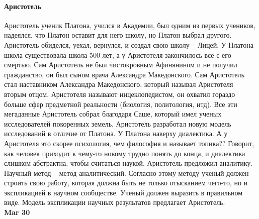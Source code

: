 \documentclass[a4paper, 12pt]{article}
\begin{document}
\paragraph{Аристотель} Аристотель ученик Платона, учился в Академии, был одним из первых учеников, надеялся, что Платон оставит для него школу, но Платон выбрал другого. Аристотель обиделся, уехал, вернулся, и создал свою школу -- Лицей. У Платона школа существовала школа 500 лет, а у Аристотеля закончилось все с его смертью. Сам Аристотель не был чистокровным Афинянином и не получил гражданство, он был сыном врача Александра Македонского. Сам Аристотель стал наставником Александра Македонского, который называл Аристотеля вторым отцом. Аристотеля называют инцеклопедистом, он охватил гораздо больше сфер предметной реальности (биология, политология, итд). Все эти мегаданные Аристотель собрал благодаря Саше, который имел ученых исследователей покоренных земель. Аристотель разработал новую модель исследований в отличие от Платона. У Платона наверху диалектика. А у Аристотеля это скорее психология, чем философия и называет топика?? Говорит, как человек приходит к чему-то новому трудно понять до конца, и диалектика слишком абстрактна, чтобы считаться наукой. Аристотель предложил аналитику. Научный метод -- метод аналитический. Согласно этому методу ученый должен строить свою работу, которая должна быть не только отысканием чего-то, но и экспликацией в научном сообществе. Ученый должен выразить в правильном виде. Модель экспликации научных результатов предлагает Аристотель. \\

\hfill \textbf{Mar 30}
\end{document}
